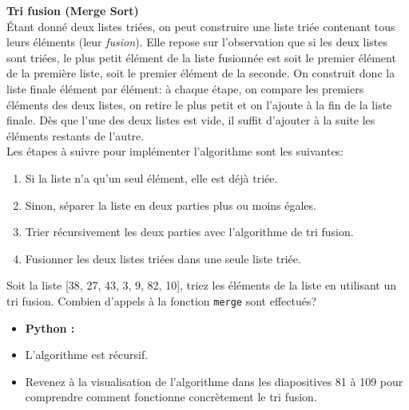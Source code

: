 \begin{Exercice} [30 minutes] [Python] \textbf{Tri fusion (Merge Sort)} \\
    Étant donné deux listes triées, on peut construire une liste triée contenant tous leurs éléments (leur \textit{fusion}). Elle repose sur l'observation que si les deux listes sont triées, le plus petit élément de la liste fusionnée est soit le premier élément de la première liste, soit le premier élément de la seconde. On construit donc la liste finale élément par élément: à chaque étape, on compare les premiers éléments des deux listes, on retire le plus petit et on l'ajoute à la fin de la liste finale. Dès que l'une des deux listes est vide, il suffit d'ajouter à la suite les éléments restants de l'autre. \\
    
    Les étapes à suivre pour implémenter l'algorithme sont les suivantes:
    \begin{enumerate}
        \item Si la liste n'a qu'un seul élément, elle est déjà triée.
        \item Sinon, séparer la liste en deux parties plus ou moins égales.
        \item Trier récursivement les deux parties avec l'algorithme de tri fusion.
        \item Fusionner les deux listes triées dans une seule liste triée.
    \end{enumerate}
    
    Soit la liste [38, 27, 43, 3, 9, 82, 10], triez les éléments de la liste en utilisant un tri fusion. Combien d'appels à la fonction \texttt{merge} sont effectués?
    
    \begin{itemize}
        \item \textbf{Python :}
            
    \end{itemize}
    
    \begin{conseil}
    \begin{itemize}
        \item L'algorithme est récursif. 
        \item Revenez à la visualisation de l'algorithme dans les diapositives 81 à 109 pour comprendre comment fonctionne concrètement le tri fusion. 
    \end{itemize}
    
    \end{conseil}


\end{Exercice}
